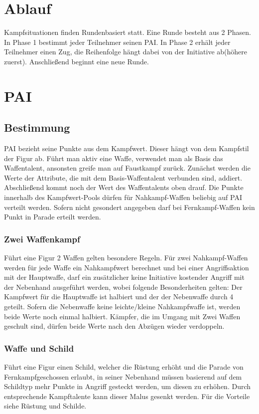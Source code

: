 \documentclass[a4paper,12pt,oneside]{book}
\begin{document}
\chapter{Ablauf}
Kampfsituationen finden Rundenbasiert statt. Eine Runde besteht aus 2 Phasen. 
In Phase 1 bestimmt jeder Teilnehmer seinen PAI. In Phase 2 erhält jeder Teilnehmer einen Zug, die Reihenfolge hängt dabei von der Initiative ab(höhere zuerst).
Anschließend beginnt eine neue Runde.

\chapter{PAI}

\section{Bestimmung}
PAI bezieht seine Punkte aus dem Kampfwert. Dieser hängt von dem Kampfstil der Figur ab. Führt man aktiv eine Waffe, verwendet man als Basis das Waffentalent, ansonsten greife man auf Faustkampf zurück. 
Zunächst werden die Werte der Attribute, die mit dem Basis-Waffentalent verbunden sind, addiert. Abschließend kommt noch der Wert des Waffentalents oben drauf. Die Punkte innerhalb des Kampfwert-Pools dürfen
für Nahkampf-Waffen beliebig auf PAI verteilt werden. Sofern nicht gesondert angegeben darf bei Fernkampf-Waffen kein Punkt in Parade erteilt werden.
\subsection{Zwei Waffenkampf}
Führt eine Figur 2 Waffen gelten besondere Regeln.
Für zwei Nahkampf-Waffen werden für jede Waffe ein Nahkampfwert berechnet und bei einer Angriffsaktion mit der Hauptwaffe, darf ein zusätzlicher keine Initiative kostender Angriff mit der Nebenhand ausgeführt werden, wobei folgende Besonderheiten gelten:
Der Kampfwert für die Hauptwaffe ist halbiert und der der Nebenwaffe durch 4 geteilt. Sofern die Nebenwaffe keine leichte/kleine Nahkampfwaffe ist, werden beide Werte noch einmal halbiert.
Kämpfer, die im Umgang mit Zwei Waffen geschult sind, dürfen beide Werte nach den Abzügen wieder verdoppeln.
\subsection{Waffe und Schild}
Führt eine Figur einen Schild, welcher die Rüstung erhöht und die Parade von Fernkampfgeschossen erlaubt, in seiner Nebenhand müssen basierend auf dem Schildtyp mehr Punkte in Angriff gesteckt werden, um diesen zu erhöhen. Durch entsprechende Kampftalente kann dieser Malus gesenkt werden. 
Für die Vorteile siehe Rüstung und Schilde.
\end{document}
